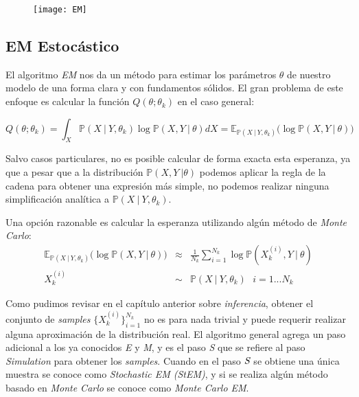 \begin{figure}
	\centering
	\texttt{[image: EM]}
\end{figure}

\subsection{EM Estocástico}

El algoritmo \emph{EM} nos da un método para estimar los parámetros $\theta $ de nuestro modelo de una forma clara y con fundamentos sólidos. El gran problema de este enfoque es calcular la función $Q(\theta;\theta _{k})$ en el caso general:

\begin{equation*}
Q(\theta ;\theta _{k})=\int_{X}\mathbb{P}(X\ |\ Y,\theta _{k})\log \mathbb{P}
(X,Y\ |\ \theta )dX=\mathbb{E}_{\mathbb{P}(X\ |\ Y,\theta _{k})}\mathbb{(}
\log \mathbb{P}(X,Y\ |\ \theta )\mathbb{)}
\end{equation*}

Salvo casos particulares, no es posible calcular de forma exacta esta esperanza, ya que a pesar que a la distribución $\mathbb{P}(X,Y\ |\theta )$ podemos aplicar la regla de la cadena para obtener una expresión más simple, no podemos realizar ninguna simplificación analítica a $\mathbb{P}(X\ |\ Y,\theta _{k})$.

Una opción razonable es calcular la esperanza utilizando algún método de \emph{Monte Carlo}:
\begin{eqnarray*}
	\mathbb{E}_{\mathbb{P}(X\ |\ Y,\theta _{k})}\mathbb{(}\log \mathbb{P}(X,Y\
	|\ \theta )\mathbb{)} &\mathbb{\approx }&\frac{1}{N_{k}}\sum_{i=1}^{N_{k}}%
	\log \mathbb{P}(X_{k}^{(i)},Y\ |\ \theta ) \\
	X_{k}^{(i)} &\sim &\mathbb{P}(X\ |\ Y,\theta _{k})\text{ }i=1...N_{k}
\end{eqnarray*}

Como pudimos revisar en el capítulo anterior sobre \emph{inferencia}, obtener el conjunto de \emph{samples} $\{X_{k}^{(i)}\}_{i=1}^{N_{k}}$ no es para nada trivial y puede requerir realizar alguna aproximación de la distribución real. El algoritmo general agrega un paso adicional a los ya conocidos \emph{E} y \emph{M}, y es el paso \emph{S} que se refiere al paso \emph{Simulation} para obtener los \emph{samples}. Cuando en el paso $\emph{S}$ se obtiene una única muestra se conoce como \emph{Stochastic EM (StEM)}, y si se realiza algún método basado en \emph{Monte Carlo} se conoce como \emph{Monte Carlo EM}. 


